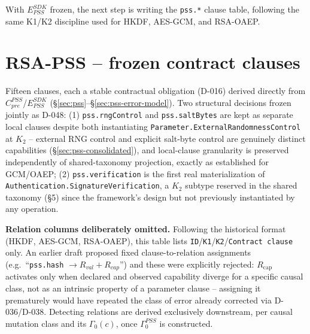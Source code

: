\documentclass[11pt,a4paper]{article}
\begin{document}
With $E_{PSS}^{SDK}$ frozen, the next step is writing the \texttt{pss.*} clause table, following the same K1/K2 discipline used for HKDF, AES-GCM, and RSA-OAEP.

\section{RSA-PSS -- frozen contract clauses}\label{sec:pss-clauses}
Fifteen clauses, each a stable contractual obligation (D-016) derived directly from $C_{pre}^{PSS}$/$E_{PSS}^{SDK}$ (\S\ref{sec:pss}--\S\ref{sec:pss-error-model}). Two structural decisions frozen jointly as D-048: (1) \texttt{pss.rngControl} and \texttt{pss.saltBytes} are kept as separate local clauses despite both instantiating \texttt{Parameter.ExternalRandomnessControl} at $K_2$ -- external RNG control and explicit salt-byte control are genuinely distinct capabilities (\S\ref{sec:pss-consolidated}), and local-clause granularity is preserved independently of shared-taxonomy projection, exactly as established for GCM/OAEP; (2) \texttt{pss.verification} is the first real materialization of \texttt{Authentication.SignatureVerification}, a $K_2$ subtype reserved in the shared taxonomy (\S5) since the framework's design but not previously instantiated by any operation.

\textbf{Relation columns deliberately omitted.} Following the historical format (HKDF, AES-GCM, RSA-OAEP), this table lists \texttt{ID}/\texttt{K1}/\texttt{K2}/\texttt{Contract clause} only. An earlier draft proposed fixed clause-to-relation assignments (e.g.\ ``\texttt{pss.hash} $\to R_{val}+R_{cap}$'') and these were explicitly rejected: $R_{\text{cap}}$ activates only when declared and observed capability diverge for a specific causal class, not as an intrinsic property of a parameter clause -- assigning it prematurely would have repeated the class of error already corrected via D-036/D-038. Detecting relations are derived exclusively downstream, per causal mutation class and its $\Gamma_0(c)$, once $\Gamma_0^{PSS}$ is constructed.
\end{document}
